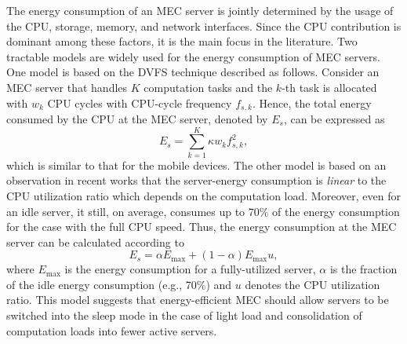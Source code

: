 \documentclass[journal]{IEEEtran}
\begin{document}

The energy consumption of an MEC server is jointly determined by the usage of the CPU, storage, memory, and network interfaces. Since the CPU contribution is dominant among these factors,  it is the main focus in the literature.  Two tractable models are widely used for  the energy consumption of  MEC servers. One model is based on the DVFS technique described as follows. Consider an MEC server that handles $K$ computation tasks and the $k$-th task is allocated with $w_k$ CPU cycles with CPU-cycle frequency $f_{s,k}$. Hence, the total energy consumed by the CPU at the MEC server, denoted by $E_s$, can be expressed as
\begin{equation}
E_s=\sum_{k=1}^K \kappa w_k f^{2}_{{s,k}},
\end{equation}
which is similar to that for the mobile devices. The other model is based on an observation in recent works \cite{fan2007power,lin2011energy,beloglazov2012energy} that the server-energy consumption is \emph{linear} to the CPU utilization ratio which depends on the computation load. Moreover, even for an idle server, it still, on average, consumes up to 70\% of the energy consumption for the case with  the full CPU speed. Thus, the energy consumption at the MEC server can be calculated according to
\begin{equation}
E_s=\alpha E_{\max}+(1-\alpha)E_{\max} u,
\label{ServerEnergyUtiRatio}
\end{equation}
where $E_{\max}$ is the energy consumption for a fully-utilized server, $\alpha$ is the fraction of the idle energy consumption (e.g., 70\%) and $u$ denotes the CPU utilization ratio. This model suggests that energy-efficient MEC should allow  servers to be switched into the  sleep mode in the case of  light load and consolidation of computation loads into fewer active servers.
\end{document}
